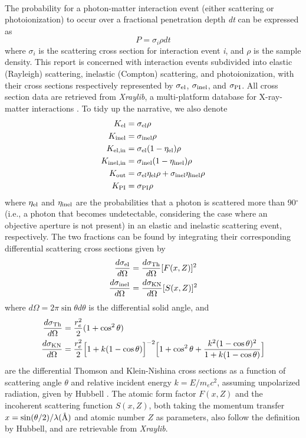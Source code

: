 \documentclass[review]{elsarticle}
\newcommand\el{\textup{\scriptsize{el}}}
\newcommand\inel{\textup{\scriptsize{inel}}}
\newcommand\elin{\textup{\scriptsize{el,in}}}
\newcommand\inelin{\textup{\scriptsize{inel,in}}}
\newcommand\out{\textup{\scriptsize{out}}}
\newcommand\PI{\textup{\scriptsize{PI}}}
\newcommand\Th{\textup{\scriptsize{Th}}}
\newcommand\KN{\textup{\scriptsize{KN}}}
\newcommand{\angstrom}{\mbox{\normalfont\AA}}
\begin{document}
\paragraph{} The probability for a photon-matter interaction event (either scattering or photoionization) to occur over a fractional penetration depth \textit{dt} can be expressed as
\begin{equation}
P = \sigma_{i} \rho dt
\end{equation}
where $\sigma_{i}$ is the scattering cross section for interaction event \textit{i}, and $\rho$ is the sample density. This report is concerned with interaction events subdivided into elastic (Rayleigh) scattering, inelastic (Compton) scattering, and photoionization, with their cross sections respectively represented by $\sigma_{\el}$, $\sigma_{\inel}$, and $\sigma_{\PI}$. All cross section data are retrieved from \textit{Xraylib}, a multi-platform database for X-ray-matter interactions \cite{Schoonjans:2011km}. To tidy up the narrative, we also denote
\begin{align}
K_{\el} &= \sigma_{\el}\rho \\
K_{\inel} &= \sigma_{\inel}\rho \\
K_{\elin} &= \sigma_{\el}(1-\eta_\el)\rho \\
K_{\inelin} &= \sigma_{\inel}(1-\eta_\inel)\rho
\label{eq:inelin} \\
K_{\out} &= \sigma_{\el}\eta_\el\rho + \sigma_{\inel}\eta_\inel\rho \\
K_{\PI} &= \sigma_{\PI}\rho
\end{align}
where $\eta_\el$ and $\eta_\inel$ are the probabilities that a photon is scattered more than 90$^\circ$ (i.e., a photon that becomes undetectable, considering the case where an objective aperture is not present) in an elastic and inelastic scattering event, respectively. The two fractions can be found by integrating their corresponding differential scattering cross sections given by \cite{Sun:2015fr}
\begin{align}
\frac{d\sigma_\el}{d\Omega} &= \frac{d\sigma_\Th}{d\Omega}[F(x,Z)]^2 \\
\frac{d\sigma_\inel}{d\Omega} &= \frac{d\sigma_\KN}{d\Omega}[S(x,Z)]^2
\label{eq:kndiff}
\end{align}
where $d\Omega = 2\pi\sin\theta d\theta$ is the differential solid angle, and 
\begin{align}
\frac{d\sigma_\Th}{d\Omega} &= \frac{r_e^2}{2}(1+\cos^2\theta) \\
\frac{d\sigma_\KN}{d\Omega} &= \frac{r_e^2}{2}\Big[1 + k(1-\cos\theta)\Big]^{-2}\Big[1 + \cos^2\theta + \frac{k^2(1-\cos\theta)^2}{1+k(1-\cos\theta)}\Big]
\end{align}
are the differential Thomson and Klein-Nishina cross sections as a function of scattering angle $\theta$ and relative incident energy $k = E/m_e c^2$, assuming unpolarized radiation, given by Hubbell \cite{Hubbell:107568}. The atomic form factor $F(x,Z)$ and the incoherent scattering function $S(x,Z)$, both taking the momentum transfer $x = \sin(\theta/2)/\lambda(\angstrom)$ and atomic number $Z$ as parameters, also follow the definition by Hubbell, and are retrievable from \textit{Xraylib}. 
\end{document}
